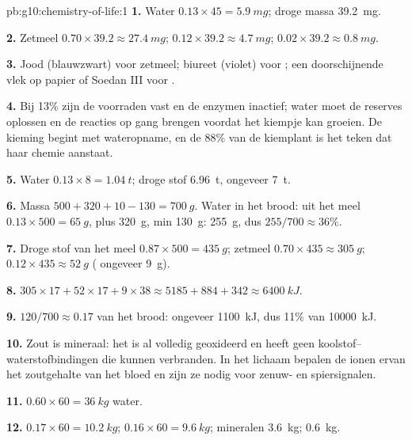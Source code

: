 \begin{solution}{pb:g10:chemistry-of-life:1}
\textbf{1.} Water $0.13 \times 45 = \qty{5.9}{mg}$; droge massa
\qty{39.2}{mg}.

\textbf{2.} Zetmeel $0.70 \times 39.2 \approx \qty{27.4}{mg}$; 
$0.12 \times 39.2 \approx \qty{4.7}{mg}$;  $0.02 \times 39.2
\approx \qty{0.8}{mg}$.

\textbf{3.} Jood (blauwzwart) voor zetmeel; biureet (violet) voor ;
een doorschijnende vlek op papier of Soedan III voor .

\textbf{4.} Bij 13\% zijn de voorraden vast en de enzymen inactief;
water moet de reserves oplossen en de reacties op gang brengen voordat
het kiempje kan groeien. De kieming begint met wateropname, en de 88\%
van de kiemplant is het teken dat haar chemie aanstaat.

\textbf{5.} Water $0.13 \times 8 = \qty{1.04}{t}$; droge stof
\qty{6.96}{t}, ongeveer \qty{7}{t}.

\textbf{6.} Massa $500 + 320 + 10 - 130 = \qty{700}{g}$. Water in het
brood: uit het meel $0.13 \times 500 = \qty{65}{g}$, plus \qty{320}{g},
min \qty{130}{g}: \qty{255}{g}, dus $255/700 \approx 36\%$.

\textbf{7.} Droge stof van het meel $0.87 \times 500 = \qty{435}{g}$;
zetmeel $0.70 \times 435 \approx \qty{305}{g}$;  $0.12 \times 435 \approx
\qty{52}{g}$ ( ongeveer \qty{9}{g}).

\textbf{8.} $305 \times 17 + 52 \times 17 + 9 \times 38 \approx 5185 +
884 + 342 \approx \qty{6400}{kJ}$.

\textbf{9.} $120/700 \approx 0.17$ van het brood: ongeveer
\qty{1100}{kJ}, dus 11\% van \qty{10000}{kJ}.

\textbf{10.} Zout is mineraal: het is al volledig geoxideerd en heeft
geen koolstof--waterstofbindingen die kunnen verbranden. In het lichaam
bepalen de ionen ervan het zoutgehalte van het bloed en zijn ze nodig
voor zenuw- en spiersignalen.

\textbf{11.} $0.60 \times 60 = \qty{36}{kg}$ water.

\textbf{12.}  $0.17 \times 60 = \qty{10.2}{kg}$;  $0.16
\times 60 = \qty{9.6}{kg}$; mineralen \qty{3.6}{kg}; 
\qty{0.6}{kg}.


\end{solution}
